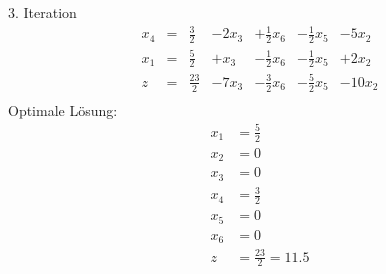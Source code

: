 \documentclass[a4paper]{scrartcl}
\begin{document}
\begin{enumerate}
        3. Iteration
        \begin{equation}
            \begin{array}{rcrrrrr}
                x_4 & = & \frac{3}{2} & -2x_3 & +\frac{1}{2}x_6 & -\frac{1}{2}x_5 & -5x_2 \\
                x_1 & = & \frac{5}{2} & +x_3 & -\frac{1}{2}x_6 & -\frac{1}{2}x_5 & +2x_2 \\
                \hline
                z   & = & \frac{23}{2} & -7x_3 & -\frac{3}{2}x_6 & -\frac{5}{2}x_5 & -10x_2 \\
            \end{array}
        \end{equation}
                Optimale Lösung:
                \begin{equation}
                    \begin{split}
                        x_1 &= \frac{5}{2} \\
                        x_2 &= 0 \\
                        x_3 &= 0 \\
                        x_4 &= \frac{3}{2} \\
                        x_5 &= 0 \\
                        x_6 &= 0 \\
                        z   &= \frac{23}{2} = \num{11,5}
                    \end{split}
                \end{equation}


\end{enumerate}
\end{document}

